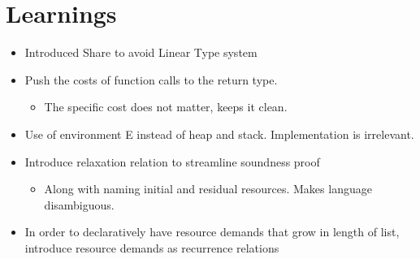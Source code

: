 \chapter{Learnings}
\begin{itemize}
	\item Introduced Share to avoid Linear Type system
	\item Push the costs of function calls to the return type. 
	   \begin{itemize}
	   	\item The specific cost does not matter, keeps it clean.
	   \end{itemize}
	\item Use of environment E instead of heap and stack. Implementation is irrelevant.
	\item Introduce relaxation relation to streamline soundness proof
	\begin{itemize}
		\item Along with naming initial and residual resources. Makes language disambiguous.
	\end{itemize}
	\item In order to declaratively have resource demands that grow in length of list, introduce resource demands as recurrence relations

\end{itemize}
